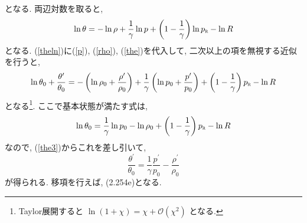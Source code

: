 \documentclass[a4j,12pt,openbib,oneside,dvipdfmx]{jsbook}
\begin{document}
\begin{itemize}
\begin{equation}
\end{equation}
となる. 両辺対数を取ると, 
\begin{equation}
 \ln\theta=-\ln\rho+{\frac{1}{\gamma}}\ln{p}+{\left(1-\frac{1}{\gamma}\right)}\ln{p_{\scalebox{0.5}{R}}}\label{theln}-\ln{R}
\end{equation}
となる. (\ref{theln})に(\ref{p}), (\ref{rho}), (\ref{the})を代入して, 二次以上の項を無視する近似を行うと, 
\begin{equation}
  \ln{\theta_0}+\frac{\theta^\prime}{\theta_0}=-\left(\ln{\rho_0}+\frac{\rho^\prime}{\rho_0} \right)+{\frac{1}{\gamma}}\left(\ln{p_0}+\frac{p^\prime}{p_0}\right) +\left(1-\frac{1}{\gamma}\right){p_{\scalebox{0.5}{R}}}-\ln{R} \label{the3}
\end{equation}
となる\footnote{Taylor展開すると $\ln\left(1+\chi\right)=\chi+\mathcal{O}(\chi^2)$ となる.}. ここで基本状態が満たす式は,
\begin{equation}
  \ln{\theta_0}={\frac{1}{\gamma}}\ln{p_0}-\ln{\rho_0}+\left(1-\frac{1}{\gamma}\right){p_{\scalebox{0.5}{R}}}-\ln{R}
\end{equation}
なので, (\ref{the3})からこれを差し引いて, 
\begin{equation}
  \frac{\theta^\prime}{\theta_0}={\frac{1}{\gamma}}{\frac{p^\prime}{p_0}}-\frac{\rho^\prime}{\rho_0}
\end{equation}
が得られる. 移項を行えば, (2.254e)となる.
\end{itemize}
\end{document}
